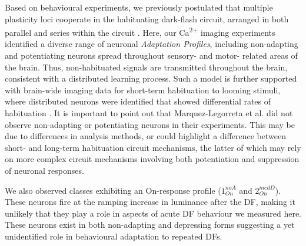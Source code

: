 \documentclass[9pt,lineno]{RandlettLab_elife}
\begin{document}
Based on behavioural experiments, we previously postulated that multiple plasticity loci cooperate in the habituating dark-flash circuit, arranged in both parallel and series within the circuit \citep{Randlett2019-fi}. Here, our Ca\textsuperscript{2+} imaging experiments identified a diverse range of neuronal \emph{Adaptation Profiles}, including non-adapting and potentiating neurons spread throughout sensory- and motor- related areas of the brain. Thus, non-habituated signals are transmitted throughout the brain, consistent with a distributed learning process. Such a model is further supported with brain-wide imaging data for short-term habituation to looming stimuli, where distributed neurons were identified that showed differential rates of habituation \citep{Marquez-Legorreta2022-ih}. It is important to point out that Marquez-Legorreta et al. did not observe non-adapting or potentiating neurons in their experiments. This may be due to differences in analysis methods, or could highlight a difference between short- and long-term habituation circuit mechanisms, the latter of which may rely on more complex circuit mechanisms involving both potentiation and suppression of neuronal responses. 

We also observed classes exhibiting an On-response profile ($1_{On}^{noA}$ and $2_{On}^{medD}$). These neurons fire at the ramping increase in luminance after the DF, making it unlikely that they play a role in aspects of acute DF behaviour we measured here. These neurons exist in both non-adapting and depressing forms suggesting a yet unidentified role in behavioural adaptation to repeated DFs. 
\end{document}
